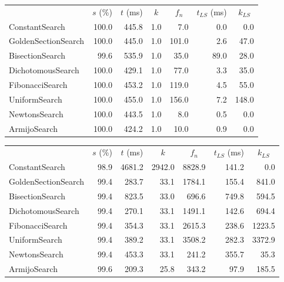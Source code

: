 \documentclass[a4paper,english,titlepage,12pt]{article}
\begin{document}
\begin{center}
\label{tab:performance_results_MSS_NM}
\begin{tabular}{|l|r|r|r|r|r|r|}
\hline
\rowcolor{gray!25}
\multicolumn{1}{|c|}{Line Search Name} & \multicolumn{1}{c|}{$s$ (\%)} & \multicolumn{1}{c|}{$t$ (ms)} & \multicolumn{1}{c|}{$k$} & \multicolumn{1}{c|}{$f_n$} & \multicolumn{1}{c|}{$t_{LS}$ (ms)} & \multicolumn{1}{c|}{$k_{LS}$} \\
ConstantSearch & 100.0 & 445.8 & 1.0 & 7.0 & 0.0 & 0.0 \\
GoldenSectionSearch & 100.0 & 445.0 & 1.0 & 101.0 & 2.6 & 47.0 \\
BisectionSearch & 99.6 & 535.9 & 1.0 & 35.0 & 89.0 & 28.0 \\
DichotomousSearch & 100.0 & 429.1 & 1.0 & 77.0 & 3.3 & 35.0 \\
FibonacciSearch & 100.0 & 453.2 & 1.0 & 119.0 & 4.5 & 55.0 \\
UniformSearch & 100.0 & 455.0 & 1.0 & 156.0 & 7.2 & 148.0 \\
NewtonsSearch & 100.0 & 443.5 & 1.0 & 8.0 & 0.5 & 0.0 \\
ArmijoSearch & 100.0 & 424.2 & 1.0 & 10.0 & 0.9 & 0.0 \\
\hline
\end{tabular}
\end{center}

\begin{center}
\label{tab:performance_results_MSS_GDM}
\begin{tabular}{|l|r|r|r|r|r|r|}
\hline
\rowcolor{gray!25}
\multicolumn{1}{|c|}{Line Search Name} & \multicolumn{1}{c|}{$s$ (\%)} & \multicolumn{1}{c|}{$t$ (ms)} & \multicolumn{1}{c|}{$k$} & \multicolumn{1}{c|}{$f_n$} & \multicolumn{1}{c|}{$t_{LS}$ (ms)} & \multicolumn{1}{c|}{$k_{LS}$} \\
ConstantSearch & 98.9 & 4681.2 & 2942.0 & 8828.9 & 141.2 & 0.0 \\
GoldenSectionSearch & 99.4 & 283.7 & 33.1 & 1784.1 & 155.4 & 841.0 \\
BisectionSearch & 99.4 & 823.5 & 33.0 & 696.6 & 749.8 & 594.5 \\
DichotomousSearch & 99.4 & 270.1 & 33.1 & 1491.1 & 142.6 & 694.4 \\
FibonacciSearch & 99.4 & 354.3 & 33.1 & 2615.3 & 238.6 & 1223.5 \\
UniformSearch & 99.4 & 389.2 & 33.1 & 3508.2 & 282.3 & 3372.9 \\
NewtonsSearch & 99.4 & 453.3 & 33.1 & 241.2 & 355.7 & 35.3 \\
ArmijoSearch & 99.6 & 209.3 & 25.8 & 343.2 & 97.9 & 185.5 \\
\hline
\end{tabular}
\end{center}
\end{document}
